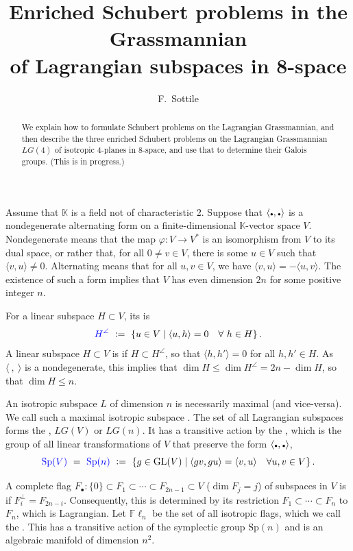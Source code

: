 \documentclass[12pt]{amsart}
\title[Enriched Schubert Problems in $\LG(4)$]{Enriched Schubert problems in the Grassmannian  \\ of Lagrangian subspaces in 8-space}
\author{F.~Sottile}
\theoremstyle{remark}
\newcommand{\GL}{\textrm{GL}}
\newcommand{\Sp}{\textrm{Sp}}
\newcommand{\Fdot}{F_\bullet}
\newcommand{\LG}{\textit{LG}}
\newcommand{\Fln}{{\mathbb F}\ell_n}
\newcommand{\KK}{{\mathbb K}}
\newcommand{\ndot}{\mbox{{\tiny$\bullet$}}}
\newcommand{\defcolor}[1]{{\color{blue}#1}}
\newcommand{\demph}[1]{\defcolor{{\sl #1}}}
\begin{document}
\begin{abstract}
  We explain how to formulate Schubert problems on the Lagrangian Grassmannian, and then
  describe the three enriched Schubert problems on the Lagrangian Grassmannian $\LG(4)$ of isotropic 4-planes in 8-space,
  and use that to determine their Galois groups. (This is in progress.)
\end{abstract}
\maketitle



Assume that $\KK$ is a field not of characteristic 2.
Suppose that $\langle\ndot,\ndot\rangle$ is a nondegenerate alternating form on a finite-dimensional $\KK$-vector space $V$.
Nondegenerate means that the map $\varphi\colon V\to V^*$ is an isomorphism from $V$ to its dual space,
or rather that, for all $0\neq v\in V$, there is some $u\in V$ such that $\langle v, u\rangle\neq 0$.
Alternating means that for all $u,v\in V$, we have $\langle v,u\rangle = - \langle u,v\rangle$.
The existence of such a form implies that $V$ has even dimension $2n$ for some positive integer $n$.

For a linear subspace $H\subset V$, its \demph{annihilator} is
\[
    \defcolor{H^\angle} \ \vcentcolon=\ \{u\in V\mid \langle u, h\rangle =0\quad\forall\ h\in H\}\,.
\]
A linear subspace $H\subset V$ is \demph{isotropic} if $H\subset H^\angle$, so that $\langle h,h'\rangle=0$
for all $h,h'\in H$.
As $\langle\:,\:\rangle$ is a nondegenerate, this implies that $\dim H \leq \dim H^\angle = 2n-\dim H$, so that
$\dim H\leq n$.

An isotropic subspace $L$ of dimension $n$ is necessarily maximal (and vice-versa).
We call such a maximal isotropic subspace \demph{Lagrangian}.
The set of all Lagrangian subspaces forms the \demph{Lagrangian Grassmannian}, \defcolor{$\LG(V)$} or \defcolor{$\LG(n)$}.
It has a transitive action by the \demph{symplectic group}, which is the group of all linear transformations of $V$ that
preserve the form $\langle\ndot,\ndot\rangle$,
\[
    \defcolor{\Sp(V)}\ =\ \defcolor{\Sp(n)}\ \vcentcolon=\
    \{ g\in \GL(V) \mid \langle gv, gu\rangle=\langle v, u\rangle\quad \forall u,v\in V\}\,.
\]

A complete flag $\Fdot\colon \{0\}\subset F_1\subset\dotsb\subset F_{2n-1}\subset V$ ($\dim F_j=j$)
of subspaces in $V$ is \demph{isotropic} if $F_i^\perp=F_{2n-i}$.
Consequently, this is determined by its restriction $F_1\subset\dotsb\subset F_n$ to $F_n$, which is Lagrangian.
Let $\Fln$ be the set of all isotropic flags, which we call the \demph{sympletic flag manifold}.
This has a transitive action of the symplectic group $\Sp(n)$ and is an algebraic manifold of dimension $n^2$.
  
\end{document}
